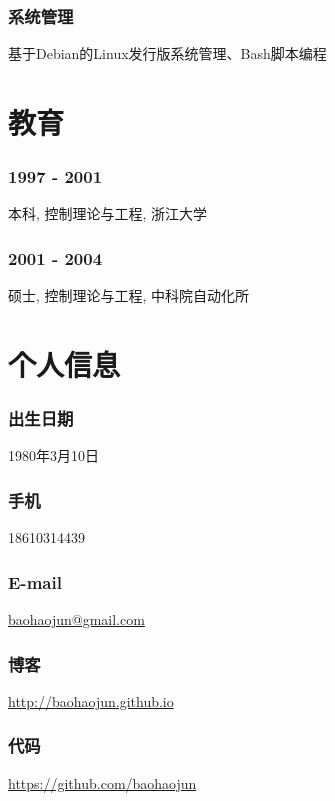 \documentclass[11pt,dvipdfm,CJKbookmarks]{article}
\begin{document}
\begin{CJK*}{UTF8}{simsun}
\subsubsection{系统管理}
\label{sec-3-0-4}
基于Debian的Linux发行版系统管理、Bash脚本编程
\section{教育}
\label{sec-4}

\subsubsection{1997 - 2001}
\label{sec-4-0-1}
本科, 控制理论与工程, 浙江大学

\subsubsection{2001 - 2004}
\label{sec-4-0-2}
硕士, 控制理论与工程, 中科院自动化所
\section{个人信息}
\label{sec-5}
\subsubsection{出生日期}
\label{sec-5-0-1}
1980年3月10日

\subsubsection{手机}
\label{sec-5-0-2}
18610314439

\subsubsection{E-mail}
\label{sec-5-0-3}
\href{mailto:baohaojun@gmail.com}{baohaojun@gmail.com}

\subsubsection{博客}
\label{sec-5-0-4}
\url{http://baohaojun.github.io}

\subsubsection{代码}
\label{sec-5-0-5}
\url{https://github.com/baohaojun}



\end{CJK*}
\end{document}
